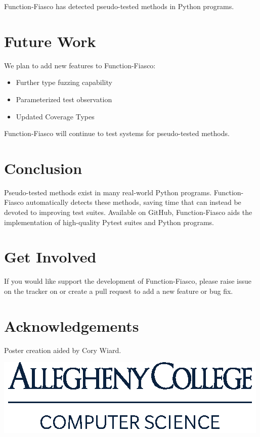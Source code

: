 \documentclass[a0paper,fleqn]{betterposter}
\begin{document}
{

Function-Fiasco has detected pseudo-tested methods in Python programs.

\section{Future Work}
%
We plan to add new features to Function-Fiasco: \\

\begin{itemize}[leftmargin=*]

\item{Further type fuzzing capability}
%
\item{Parameterized test observation}
%
\item{Updated Coverage Types}

\end{itemize}

\vspace{1em}
%
Function-Fiasco will continue to test systems for pseudo-tested methods.

\section{Conclusion}
%
Pseudo-tested methods exist in many real-world Python programs.
%
Function-Fiasco automatically detects these methods, saving time that can
instead be devoted to improving test suites.
%
Available on GitHub, Function-Fiasco aids the implementation of high-quality
Pytest suites and Python programs.

\section{Get Involved}
%
If you would like support the development of Function-Fiasco, please raise issue
on the tracker on or create a pull request to add a new feature or bug fix.
%
\vfill

\section{Acknowledgements}
%
Poster creation aided by Cory Wiard.\\

\vspace*{.5in}

\includegraphics[width=\textwidth]{img/ComputerScience-Stack}

}
\end{document}
